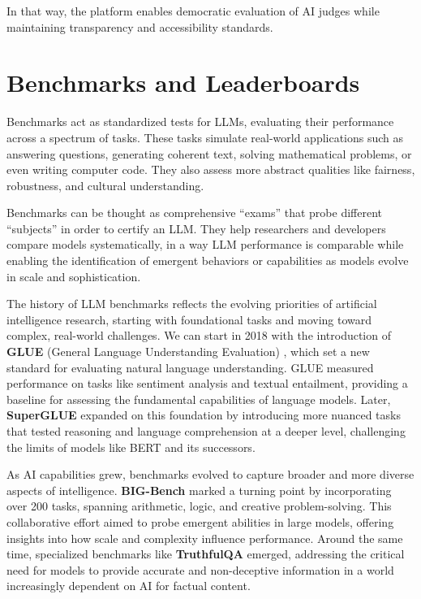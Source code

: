 In that way, the platform enables democratic evaluation of AI judges while maintaining transparency and accessibility standards.

\section{Benchmarks and Leaderboards}

Benchmarks act as standardized tests for LLMs, evaluating their performance across a spectrum of tasks. These tasks simulate real-world applications such as answering questions, generating coherent text, solving mathematical problems, or even writing computer code. They also assess more abstract qualities like fairness, robustness, and cultural understanding.

Benchmarks can be thought as comprehensive ``exams'' that probe different ``subjects'' in order to certify an LLM. They help researchers and developers compare models systematically, in a way LLM performance is comparable while enabling the identification of emergent behaviors or capabilities as models evolve in scale and sophistication.

The history of LLM benchmarks reflects the evolving priorities of artificial intelligence research, starting with foundational tasks and moving toward complex, real-world challenges. We can start in 2018 with the introduction of \textbf{GLUE} (General Language Understanding Evaluation) , which set a new standard for evaluating natural language understanding. GLUE measured performance on tasks like sentiment analysis and textual entailment, providing a baseline for assessing the fundamental capabilities of language models. Later, \textbf{SuperGLUE}  expanded on this foundation by introducing more nuanced tasks that tested reasoning and language comprehension at a deeper level, challenging the limits of models like BERT and its successors.

As AI capabilities grew, benchmarks evolved to capture broader and more diverse aspects of intelligence. \textbf{BIG-Bench}  marked a turning point by incorporating over 200 tasks, spanning arithmetic, logic, and creative problem-solving. This collaborative effort aimed to probe emergent abilities in large models, offering insights into how scale and complexity influence performance. Around the same time, specialized benchmarks like \textbf{TruthfulQA}  emerged, addressing the critical need for models to provide accurate and non-deceptive information in a world increasingly dependent on AI for factual content.

